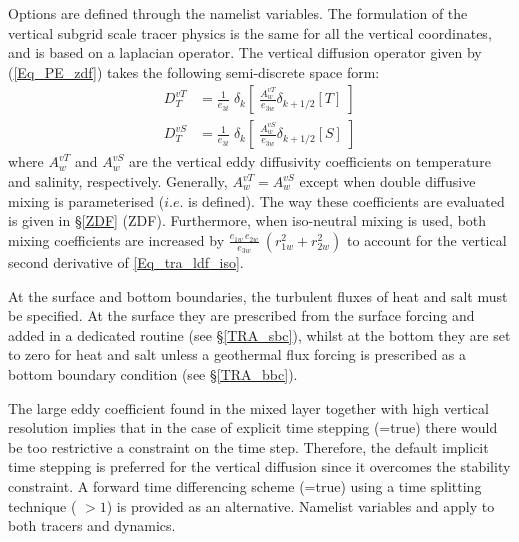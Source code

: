 \documentclass[NEMO_book]{subfiles}
\begin{document}
Options are defined through the   namelist variables.
The formulation of the vertical subgrid scale tracer physics is the same 
for all the vertical coordinates, and is based on a laplacian operator. 
The vertical diffusion operator given by (\ref{Eq_PE_zdf}) takes the 
following semi-discrete space form:
\begin{equation} \label{Eq_tra_zdf}
\begin{split}
D^{vT}_T &= \frac{1}{e_{3t}} \; \delta_k \left[ \;\frac{A^{vT}_w}{e_{3w}}  \delta_{k+1/2}[T] \;\right] 
\\
D^{vS}_T &= \frac{1}{e_{3t}} \; \delta_k \left[ \;\frac{A^{vS}_w}{e_{3w}}  \delta_{k+1/2}[S] \;\right] 
\end{split}
\end{equation}
where $A_w^{vT}$ and $A_w^{vS}$ are the vertical eddy diffusivity 
coefficients on temperature and salinity, respectively. Generally, 
$A_w^{vT}=A_w^{vS}$ except when double diffusive mixing is 
parameterised ($i.e.$  is defined). The way these coefficients 
are evaluated is given in \S\ref{ZDF} (ZDF). Furthermore, when 
iso-neutral mixing is used, both mixing coefficients are increased 
by $\frac{e_{1w}\,e_{2w} }{e_{3w} }\ \left( {r_{1w} ^2+r_{2w} ^2} \right)$ 
to account for the vertical second derivative of \eqref{Eq_tra_ldf_iso}. 

At the surface and bottom boundaries, the turbulent fluxes of 
heat and salt must be specified. At the surface they are prescribed 
from the surface forcing and added in a dedicated routine (see \S\ref{TRA_sbc}), 
whilst at the bottom they are set to zero for heat and salt unless 
a geothermal flux forcing is prescribed as a bottom boundary 
condition (see \S\ref{TRA_bbc}). 

The large eddy coefficient found in the mixed layer together with high 
vertical resolution implies that in the case of explicit time stepping 
(=true) there would be too restrictive a constraint on 
the time step. Therefore, the default implicit time stepping is preferred 
for the vertical diffusion since it overcomes the stability constraint. 
A forward time differencing scheme (=true) using a time 
splitting technique ( $> 1$) is provided as an alternative. 
Namelist variables  and  apply to both 
tracers and dynamics. 

\end{document}
